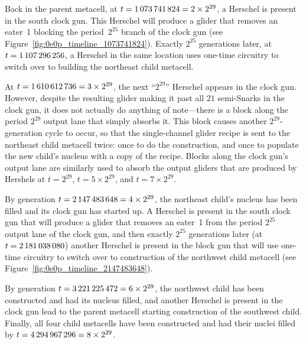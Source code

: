 Back in the parent metacell, at $t = 1{\,}073{\,}741{\,}824 = 2 \times 2^{29}$, a Herschel is present in the south clock gun. This Herschel will produce a glider that removes an eater~1 blocking the period~$2^{25}$ branch of the clock gun (see Figure~\ref{fig:0e0p_timeline_1073741824}). Exactly $2^{25}$ generations later, at $t = 1{\,}107{\,}296{\,}256$, a Herschel in the same location uses one-time circuitry to switch over to building the northeast child metacell.


At $t = 1{\,}610{\,}612{\,}736 = 3 \times 2^{29}$, the next ``$2^{29}$'' Herschel appears in the clock gun. However, despite the resulting glider making it past all $21$ semi-Snarks in the clock gun, it does not actually do anything of note---there is a block along the period $2^{29}$ output lane that simply absorbs it. This block causes another $2^{29}$-generation cycle to occur, so that the single-channel glider recipe is sent to the northeast child metacell twice: once to do the construction, and once to populate the new child's nucleus with a copy of the recipe. Blocks along the clock gun's output lane are similarly used to absorb the output gliders that are produced by Hershels at $t = 2^{29}$, $t = 5 \times 2^{29}$, and $t = 7 \times 2^{29}$.

By generation $t = 2{\,}147{\,}483{\,}648 = 4 \times 2^{29}$, the northeast child's nucleus has been filled and its clock gun has started up. A Herschel is present in the south clock gun that will produce a glider that removes an eater~1 from the period $2^{25}$ output lane of the clock gun, and then exactly $2^{25}$ generations later (at $t = 2{\,}181{\,}038{\,}080$) another Herschel is present in the block gun that will use one-time circuitry to switch over to construction of the northwest child metacell (see Figure~\ref{fig:0e0p_timeline_2147483648}).


By generation $t = 3{\,}221{\,}225{\,}472 = 6 \times 2^{29}$, the northwest child has been constructed and had its nucleus filled, and another Herschel is present in the clock gun lead to the parent metacell starting construction of the southwest child. Finally, all four child metacells have been constructed and had their nuclei filled by $t = 4{\,}294{\,}967{\,}296 = 8 \times 2^{29}$.


